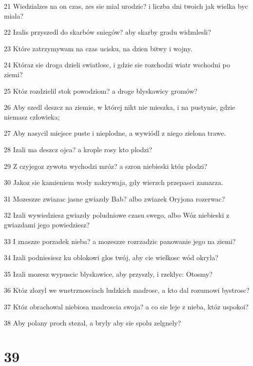 \par 21 Wiedzialzes na on czas, zes sie mial urodzic? i liczba dni twoich jak wielka byc miala?
\par 22 Izalis przyszedl do skarbów sniegów? aby skarby gradu widzalesli?
\par 23 Które zatrzymywam na czas ucisku, na dzien bitwy i wojny.
\par 24 Któraz sie droga dzieli swiatlosc, i gdzie sie rozchodzi wiatr wschodni po ziemi?
\par 25 Któz rozdzielil stok powodziom? a droge blyskawicy gromów?
\par 26 Aby szedl deszcz na ziemie, w której nikt nie mieszka, i na pustynie, gdzie niemasz czlowieka;
\par 27 Aby nasycil miejsce puste i nieplodne, a wywiódl z niego zielona trawe.
\par 28 Izali ma deszcz ojca? a krople rosy kto plodzi?
\par 29 Z czyjegoz zywota wychodzi mróz? a szron niebieski któz plodzi?
\par 30 Jakoz sie kamieniem wody nakrywaja, gdy wierzch przepasci zamarza.
\par 31 Mozeszze zwiazac jasne gwiazdy Bab? albo zwiazek Oryjona rozerwac?
\par 32 Izali wywiedziesz gwiazdy poludniowe czasu swego, albo Wóz niebieski z gwiazdami jego powiedziesz?
\par 33 I znaszze porzadek nieba? a mozeszze rozrzadzic panowanie jego na ziemi?
\par 34 Izali podniesiesz ku oblokowi glos twój, aby cie wielkosc wód okryla?
\par 35 Izali mozesz wypuscic blyskawice, aby przyszly, i rzeklyc: Otosmy?
\par 36 Któz zlozyl we wnetrznosciach ludzkich madrosc, a kto dal rozumowi bystrosc?
\par 37 Któz obrachowal niebiosa madroscia swoja? a co sie leje z nieba, któz uspokoi?
\par 38 Aby polany proch stezal, a bryly aby sie spolu zelgnely?

\chapter{39}

